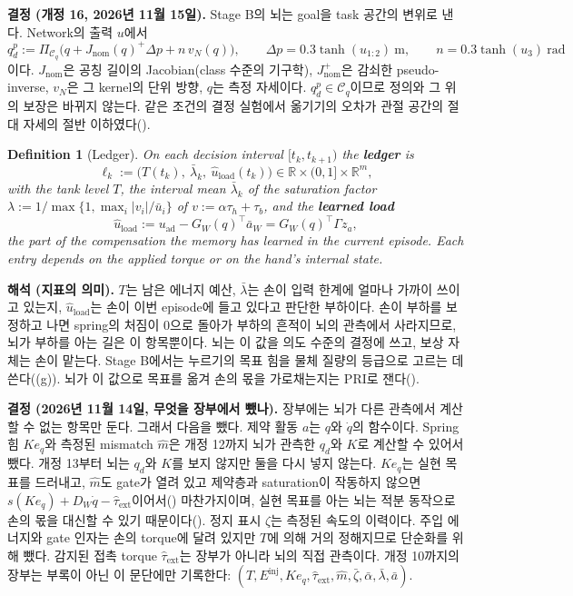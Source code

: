 \documentclass[11pt]{article}\usepackage[margin=1in]{geometry}\usepackage{amsmath,amssymb,amsthm,mathtools}\usepackage{graphicx}\graphicspath{{figures/}{../figures/}{figs/}{./}}\usepackage{enumitem}\usepackage{hyperref}\usepackage{cleveref}\usepackage{tikz}\usetikzlibrary{arrows.meta,positioning,calc,shapes.geometric}\usepackage{float}\usepackage{rotating}\usepackage[most]{tcolorbox}\usepackage{kotex}\usepackage{booktabs}\usepackage{longtable}\emergencystretch=1.6em\tolerance=2000 \crefname{assumption}{Assumption}{Assumptions}\Crefname{assumption}{Assumption}{Assumptions}\crefname{definition}{Definition}{Definitions}\Crefname{definition}{Definition}{Definitions}\crefname{proposition}{Proposition}{Propositions}\Crefname{proposition}{Proposition}{Propositions}\crefname{fact}{Fact}{Facts}\Crefname{fact}{Fact}{Facts} \newtheorem{assumption}{Assumption}\newtheorem{definition}{Definition}\newtheorem{lemma}{Lemma}\newtheorem{proposition}{Proposition}\newtheorem{theorem}{Theorem}\newtheorem{corollary}{Corollary}\newtheorem{fact}{Fact}\theoremstyle{remark}\newtheorem{remark}{Remark} \newcommand{\R}{\mathbb{R}}\newcommand{\xb}{\bar x}\newcommand{\Ab}{\bar A}\newcommand{\By}{\bar B_y}\newcommand{\U}{\mathcal U}\newcommand{\Z}{\mathcal Z}
\begin{document}
\textbf{결정 (개정 16, 2026년 11월 15일).} Stage B의 뇌는 goal을 task 공간의 변위로 낸다. Network의 출력 $u$에서
\[
q_d^p:=\Pi_{\mathcal C_q}\big(q+J_{\mathrm{nom}}(q)^{+}\Delta p+n\,v_N(q)\big),\qquad \Delta p=0.3\tanh(u_{1:2})\ \mathrm{m},\qquad n=0.3\tanh(u_3)\ \mathrm{rad}
\]
이다. $J_{\mathrm{nom}}$은 공칭 길이의 Jacobian(class 수준의 기구학), $J_{\mathrm{nom}}^{+}$은 감쇠한 pseudo-inverse, $v_N$은 그 kernel의 단위 방향, $q$는 측정 자세이다. $q_d^p\in\mathcal C_q$이므로 정의와 그 위의 보장은 바뀌지 않는다. 같은 조건의 결정 실험에서 옮기기의 오차가 관절 공간의 절대 자세의 절반 이하였다().

\begin{definition}[Ledger]
\label{def:ledger}
On each decision interval $[t_k,t_{k+1})$ the \textbf{\emph{ledger}} is
\[
\ell_k:=\big(T(t_k),\ \bar\lambda_k,\ \hat u_{\mathrm{load}}(t_k)\big)\in\R\times(0,1]\times\R^m,
\]
with the tank level $T$, the interval mean $\bar\lambda_k$ of the saturation factor $\lambda:=1/\max\{1,\max_i|v_i|/\bar u_i\}$ of $v:=\alpha\tau_h+\tau_b$, and the \textbf{\emph{learned load}}
\[
\hat u_{\mathrm{load}}:=u_{\mathrm{ad}}-G_W(q)^\top\bar a_W=G_W(q)^\top\Gamma z_a ,
\]
the part of the compensation the memory has learned in the current episode. Each entry depends on the applied torque or on the hand's internal state.
\end{definition}

\textbf{해석 (지표의 의미).} $T$는 남은 에너지 예산, $\bar\lambda$는 손이 입력 한계에 얼마나 가까이 쓰이고 있는지, $\hat u_{\mathrm{load}}$는 손이 이번 episode에 들고 있다고 판단한 부하이다. 손이 부하를 보정하고 나면 spring의 처짐이 0으로 돌아가 부하의 흔적이 뇌의 관측에서 사라지므로, 뇌가 부하를 아는 길은 이 항목뿐이다. 뇌는 이 값을 의도 수준의 결정에 쓰고, 보상 자체는 손이 맡는다. Stage B에서는 누르기의 목표 힘을 물체 질량의 등급으로 고르는 데 쓴다((g)). 뇌가 이 값으로 목표를 옮겨 손의 몫을 가로채는지는 PRI로 잰다().

\textbf{결정 (2026년 11월 14일, 무엇을 장부에서 뺐나).} 장부에는 뇌가 다른 관측에서 계산할 수 없는 항목만 둔다. 그래서 다음을 뺐다. 제약 활동 $a$는 $q$와 $\dot q$의 함수이다. Spring 힘 $Ke_q$와 측정된 mismatch $\hat m$은 개정 12까지 뇌가 관측한 $q_d$와 $K$로 계산할 수 있어서 뺐다. 개정 13부터 뇌는 $q_d$와 $K$를 보지 않지만 둘을 다시 넣지 않는다. $Ke_q$는 실현 목표를 드러내고, $\hat m$도 gate가 열려 있고 제약층과 saturation이 작동하지 않으면 $s(Ke_q)+D_W\dot q-\hat\tau_{\mathrm{ext}}$이어서() 마찬가지이며, 실현 목표를 아는 뇌는 적분 동작으로 손의 몫을 대신할 수 있기 때문이다(). 정지 표시 $\zeta$는 측정된 속도의 이력이다. 주입 에너지와 gate 인자는 손의 torque에 달려 있지만 $T$에 의해 거의 정해지므로 단순화를 위해 뺐다. 감지된 접촉 torque $\hat\tau_{\mathrm{ext}}$는 장부가 아니라 뇌의 직접 관측이다. 개정 10까지의 장부는 부록이 아닌 이 문단에만 기록한다: $(T,E^{\mathrm{inj}},Ke_q,\hat\tau_{\mathrm{ext}},\hat m,\bar\zeta,\bar\alpha,\bar\lambda,\bar a)$.
\end{document}
